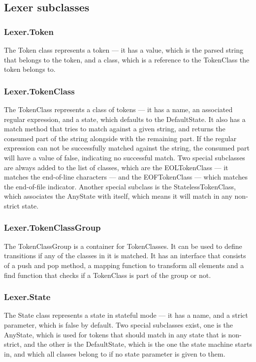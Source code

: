 \subsection{Lexer subclasses}
\subsubsection{Lexer.Token}
The Token class represents a token --- it has a value, which is the parsed string that belongs to the token, and a class, which is a reference to the TokenClass the token belongs to.
\subsubsection{Lexer.TokenClass}
The TokenClass represents a class of tokens --- it has a name, an associated regular expression, and a state, which defaults to the DefaultState. It also has a match method that tries to match against a given string, and returns the consumed part of the string alongside with the remaining part. If the regular expression can not be successfully matched against the string, the consumed part will have a value of false, indicating no successful match.
Two special subclasses are always added to the list of classes, which are the EOLTokenClass --- it matches the end-of-line characters --- and the EOFTokenClass --- which matches the end-of-file indicator.
Another special subclass is the StatelessTokenClass, which associates the AnyState with itself, which means it will match in any non-strict state.
\subsubsection{Lexer.TokenClassGroup}
The TokenClassGroup is a container for TokenClasses. It can be used to define transitions if any of the classes in it is matched. It has an interface that consists of a push and pop method, a mapping function to transform all elements and a find function that checks if a TokenClass is part of the group or not.
\subsubsection{Lexer.State}
The State class represents a state in stateful mode --- it has a name, and a strict parameter, which is false by default.
Two special subclasses exist, one is the AnyState, which is used for tokens that should match in any state that is non-strict, and the other is the DefaultState, which is the one the state machine starts in, and which all classes belong to if no state parameter is given to them.
